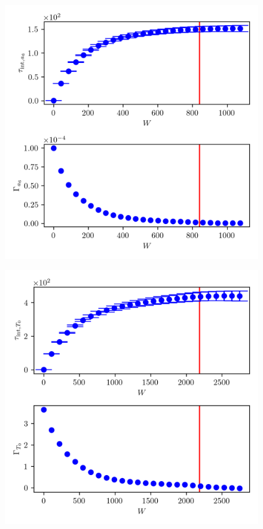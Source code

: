 \begin{figure}[ht!]
	\centering
	\includegraphics{UwerrTauIntTWalk12.png}
	\caption[]{}
	\label{fig:}
\end{figure}
\begin{figure}[ht!]
\centering
\includegraphics{UwerrTauIntTWalk13.png}
\caption[]{}
\label{fig:}
\end{figure}
